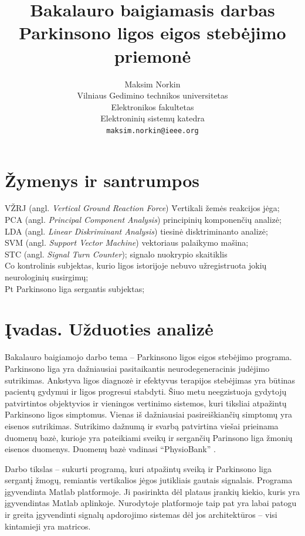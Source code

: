 \documentclass[]{vgtuef}
\author{Maksim Norkin\\Vilniaus Gedimino technikos universitetas\\Elektronikos fakultetas\\Elektroninių sistemų katedra\\\texttt{maksim.norkin@ieee.org}}
\title{Bakalauro baigiamasis darbas\\Parkinsono ligos eigos stebėjimo priemonė}
\begin{document}
\setcounter{page}{7}

\onehalfspacing


\tableofcontents

\section*{Žymenys ir santrumpos}

\begin{tabbing}
VŽRJ (angl. \textit{Vertical Ground Reaction Force}) \= Vertikali žemės reakcijos jėga; \\
PCA (angl. \textit{Principal Component Analysis}) \> principinių komponenčių analizė;\\
LDA (angl. \textit{Linear Diskriminant Analysis}) \> tiesinė disktriminanto analizė; \\
SVM (angl. \textit{Support Vector Machine}) \> vektoriaus palaikymo mašina; \\
STC (angl. \textit{Signal Turn Counter}); \> signalo nuokrypio skaitiklis \\
Co \> kontrolinis subjektas, kurio ligos istorijoje nebuvo užregistruota jokių neurologinių susirgimų; \\
Pt \> Parkinsono liga sergantis subjektas; \\
\end{tabbing}

\section{Įvadas. Užduoties analizė}

Bakalauro baigiamojo darbo tema -- Parkinsono ligos eigos stebėjimo programa. Parkinsono liga yra dažniausiai pasitaikantis neurodegeneracinis judėjimo sutrikimas. Ankstyva ligos diagnozė ir efektyvus terapijos stebėjimas yra būtinas pacientų gydymui ir ligos progresui stabdyti. Šiuo metu neegzistuoja gydytojų patvirtintos objektyvios ir vieningos vertinimo sistemos, kuri tiksliai atpažintų Parkinsono ligos simptomus. Vienas iš dažniausiai pasireiškiančių simptomų yra eisenos sutrikimas. Sutrikimo dažnumą ir svarbą patvirtina viešai prieinama duomenų bazė, kurioje yra pateikiami sveikų ir sergančių Parinsono liga žmonių eisenos duomenys. Duomenų bazė vadinasi ``PhysioBank'' \cite{932728}.

Darbo tikslas -- sukurti programą, kuri atpažintų sveiką ir Parkinsono liga sergantį žmogų, remiantis vertikalios jėgos jutikliais gautais signalais. Programa įgyvendinta Matlab platformoje. Ji pasirinkta dėl plataus įrankių kiekio, kuris yra įgyvendintas Matlab aplinkoje. Nurodytoje platformoje taip pat yra labai patogu ir greita įgyvendinti signalų apdorojimo sistemas dėl jos architektūros -- visi kintamieji yra matricos. 
\end{document}
